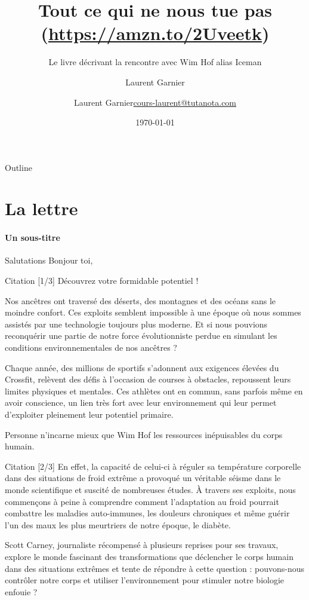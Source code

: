 \documentclass[presentation]{beamer}
\author{Laurent Garnier}
\date{\today}
\title{Tout ce qui ne nous tue pas (\url{https://amzn.to/2Uveetk})}
\author{\texorpdfstring{Laurent Garnier\newline\url{cours-laurent@tutanota.com}}{Laurent Garnier}}
\subtitle{Le livre décrivant la rencontre avec Wim Hof alias Iceman}
\begin{document}
\maketitle
\begin{frame}{Outline}
\tableofcontents
\end{frame}



\section{La lettre}
\label{sec:orgaded47a}
\framesubtitle{Un sous-titre}
\begin{frame}[label={sec:orgfc0fdbc}]{Salutations}
Bonjour toi,
\end{frame}


\begin{frame}[label={sec:orgf204b8a}]{Citation [1/3]}
Découvrez votre formidable potentiel !

Nos ancêtres ont traversé des déserts, des montagnes et des océans sans le moindre confort. Ces exploits semblent impossible à une époque où nous sommes assistés par une technologie toujours plus moderne. Et si nous pouvions reconquérir une partie de notre force évolutionniste perdue en simulant les conditions environnementales de nos ancêtres ?

Chaque année, des millions de sportifs s'adonnent aux exigences élevées du Crossfit, relèvent des défis à l'occasion de courses à obstacles, repoussent leurs limites physiques et mentales. Ces athlètes ont en commun, sans parfois même en avoir conscience, un lien très fort avec leur environnement qui leur permet d'exploiter pleinement leur potentiel primaire.

Personne n'incarne mieux que Wim Hof les ressources inépuisables du corps humain.
\end{frame}

\begin{frame}[label={sec:org9e55387}]{Citation [2/3]}
En effet, la capacité de celui-ci à réguler sa température corporelle dans des situations de froid extrême a provoqué un véritable séisme dans le monde scientifique et suscité de nombreuses études. À travers ses exploits, nous commençons à peine à comprendre comment l'adaptation au froid pourrait combattre les maladies auto-immunes, les douleurs chroniques et même guérir l'un des maux les plus meurtriers de notre époque, le diabète.

Scott Carney, journaliste récompensé à plusieurs reprises pour ses travaux, explore le monde fascinant des transformations que déclencher le corps humain dans des situations extrêmes et tente de répondre à cette question : pouvons-nous contrôler notre corps et utiliser l'environnement pour stimuler notre biologie enfouie ?
\end{frame}
\end{document}
